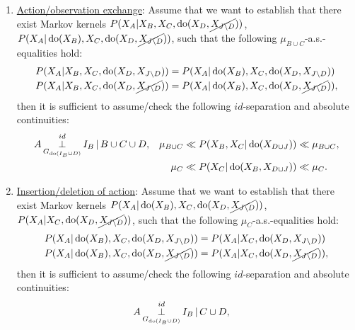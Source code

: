 \begin{Cor}
\begin{enumerate}
\begin{align*}
             \mu_{B \cup C} &\ll P(X_B,X_C|\doit(X_{D \cup J}))\ll \mu_{B \cup C}.
         \end{align*}
     \item \underline{Action/observation exchange}: 
       Assume that we want to establish 
       that there exist Markov kernels $P(X_A|X_B,X_C,\operatorname{do}(X_{D},\cancel{X_{J\setminus D}}))$, $P(X_A|\operatorname{do}(X_B),X_C,\operatorname{do}(X_{D},\cancel{X_{J\setminus D}}))$,
       such that the following $\mu_{B \cup C}$-a.s.-equalities hold:
            \begin{equation*}\begin{split}
            P(X_A|X_B,X_C,\operatorname{do}(X_{D},X_{J\setminus D})) &= P(X_A|\operatorname{do}(X_B),X_C,\operatorname{do}(X_{D},X_{J\setminus D})) \\
            P(X_A|X_B,X_C,\operatorname{do}(X_{D},\cancel{X_{J\setminus D}})) &= P(X_A|\operatorname{do}(X_B),X_C,\operatorname{do}(X_{D},\cancel{X_{J\setminus D}})),
            \end{split}\end{equation*}
         then it is sufficient to assume/check the following $id$-separation and absolute continuities:
         \begin{align*} 
             A & \operatorname*{\perp}^{id}_{G_{\operatorname{do}(I_B\cup D)}} I_B \operatorname*{|} B \cup C \cup D, &          
                    \mu_{B \cup C} &\ll  P(X_B,X_C|\operatorname{do}(X_{D\cup J})) \ll \mu_{B \cup C},\\
                 &&   \mu_C &\ll  P(X_C|\operatorname{do}(X_B,X_{D\cup J})) \ll \mu_C.
         \end{align*}
     \item \underline{Insertion/deletion of action}: 
        Assume that we want to establish
        that there exist Markov kernels $P(X_A|\operatorname{do}(X_B),X_C,\operatorname{do}(X_{D},\cancel{X_{J\setminus D}}))$, $P(X_A|X_C,\operatorname{do}(X_{D},\cancel{X_{J\setminus D}}))$,
        such that the following $\mu_C$-a.s.-equalities hold:
            \begin{equation*}\begin{split}
              P(X_A|\operatorname{do}(X_B),X_C,\operatorname{do}(X_{D},X_{J\setminus D})) &= P(X_A|X_C,\operatorname{do}(X_{D},X_{J\setminus D})) \\
              P(X_A|\operatorname{do}(X_B),X_C,\operatorname{do}(X_{D},\cancel{X_{J\setminus D}})) &= P(X_A|X_C,\operatorname{do}(X_{D},\cancel{X_{J\setminus D}})),
            \end{split}\end{equation*}
          then it is sufficient to assume/check the following $id$-separation and absolute continuities:
         \begin{align*} 
             A &\idPerp_{G_{\doit(I_B\cup D)}} I_B \given C  \cup D, &          

\end{align*}
\end{enumerate}
\end{Cor}
